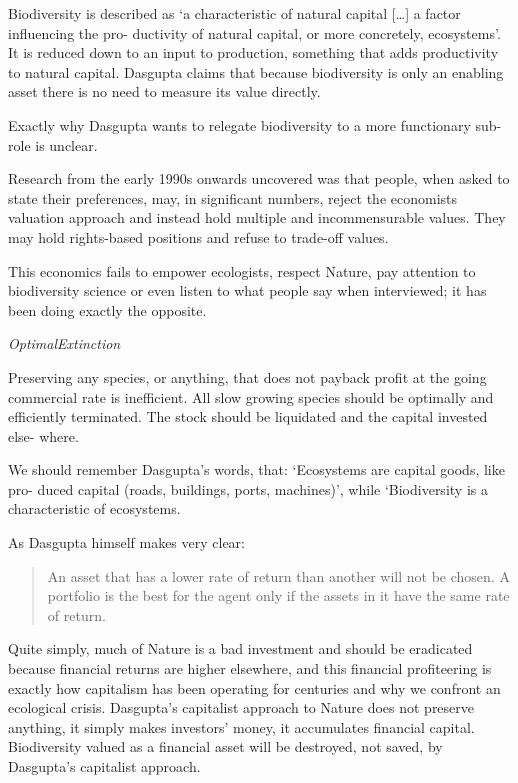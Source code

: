 \documentclass[
]{book}
\begin{document}
Biodiversity is described as `a characteristic of natural capital {[}\ldots{]} a factor influencing the pro-
ductivity of natural capital, or more concretely, ecosystems'. It is reduced
down to an input to production, something that adds productivity to natural capital. Dasgupta claims
that because biodiversity is only an enabling asset there is no need to measure its value directly.

Exactly why Dasgupta wants to relegate biodiversity to a more functionary sub-role is unclear.

Research from the early
1990s onwards uncovered was that people, when asked to state their preferences, may, in significant
numbers, reject the economists valuation approach and instead hold multiple and
incommensurable values.
They may hold rights-based positions and refuse to trade-off values.

This economics fails to empower ecologists, respect Nature, pay attention to
biodiversity science or even listen to what people say
when interviewed; it has been doing exactly the opposite.

\emph{OptimalExtinction}

Preserving any species, or anything, that
does not payback profit at the going commercial rate is inefficient.
All slow growing species should
be optimally and efficiently terminated. The stock should be liquidated and the capital invested else-
where.

We should remember Dasgupta's words, that: `Ecosystems are capital goods, like pro-
duced capital (roads, buildings, ports, machines)', while `Biodiversity is a characteristic of
ecosystems.

As Dasgupta himself makes very clear:

\begin{quote}
An asset that has a lower rate of return than another will not be chosen. A portfolio is the best for the agent only if the assets in it have the same rate of return.
\end{quote}

Quite simply, much of Nature is a bad investment and should be eradicated because financial returns
are higher elsewhere, and this financial profiteering is exactly how capitalism has been operating for
centuries and why we confront an ecological crisis. Dasgupta's capitalist approach to Nature does not
preserve anything, it simply makes investors' money, it accumulates financial capital. Biodiversity
valued as a financial asset will be destroyed, not saved, by Dasgupta's capitalist approach.
\end{document}
